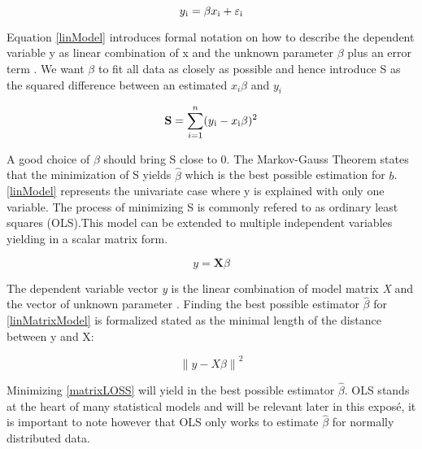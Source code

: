 \documentclass{article}
\begin{document}
    \begin{equation}  \label{linModel} y\textsubscript{i} = \beta x\textsubscript{i} + \varepsilon\textsubscript{i} \end{equation}

    Equation \ref{linModel} introduces formal notation on how to describe the dependent variable y as linear combination of x and the unknown parameter $\beta$ plus an error term \textepsilon. We want $\beta$ to fit all data as closely as possible and hence introduce S as the squared difference between an estimated $x_i \beta$ and $y_i$

    \begin{equation} \label{sumSquares} \mathbf{S} =  \sum_{i=1}^{n}(y\textsubscript{i} - x\textsubscript{i}\beta)^{2} \end{equation}

    A good choice of $\beta$ should bring S close to 0. The  Markov-Gauss Theorem states that the minimization of S yields $\widehat{\beta}$ which is the best possible estimation for $b$. \ref{linModel} represents the univariate case where y is explained with only one variable. The process of minimizing S is commonly refered to as ordinary least squares (OLS).This model can be extended to multiple independent variables yielding in a scalar matrix form.

    \begin{equation}  \label{linMatrixModel} y =  \mathbf{X} \beta \end{equation}

     The dependent  variable vector \textit{y} is the linear combination of model matrix \textit{X} and the vector of unknown parameter \textbeta. Finding the best possible estimator $\widehat{\beta}$ for \ref{linMatrixModel} is formalized stated as the minimal length of the distance between y and X\textbeta:

    \begin{equation} \label{matrixLOSS} \left \| y - X\beta  \right \|^2 \end{equation}

    Minimizing \ref{matrixLOSS} will yield in the best possible estimator $\widehat{\beta}$. OLS stands at the heart of many statistical models and will be relevant later in this exposé, it is important to note however that OLS only works to estimate $\widehat{\beta}$ for normally distributed data.
\end{document}
